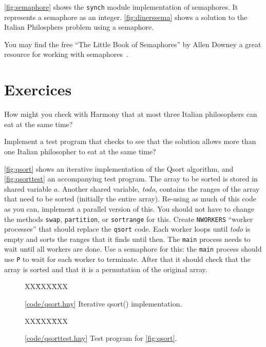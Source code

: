 \documentclass{report}
\newcommand{\harmonysource}[1]{
\begin{tabbing}
XX\=XXX\=XXX\kill
    
\end{tabbing}
}
\newcommand{\harmonylink}[1]{%
[\href{https://www.cs.cornell.edu/home/rvr/harmony/#1}{\underline{#1}}]%
}
\newenvironment{code}{
\tcolorbox
}{
\endtcolorbox
}
\begin{document}
\autoref{fig:semaphore} shows the \texttt{synch} module implementation of
semaphores.
It represents a semaphore as an integer.
\autoref{fig:dinerssema} shows a solution to the Italian Philosphers problem
using a semaphore.

You may find the free ``The Little Book of Semaphores'' by
Allen Downey a great resource for working with semaphores~\cite{Downey09}.

\section*{Exercices}
\begin{problems}
\item How might you check with Harmony that at most three
Italian philosophers can eat at the same time?
\item Implement a test program that checks to see that
the solution allows more than one Italian philosopher to eat at the same time?
\item \label{ex:qsort}
\autoref{fig:qsort} shows an iterative implementation of the Qsort
algorithm, and \autoref{fig:qsorttest} an accompanying test program.
The array to be sorted is stored in  shared variable $a$.
Another shared variable, \textit{todo}, contains the ranges of the
array that need to be sorted (initially the entire array).
Re-using as much of this code as you can, implement a parallel version of
this.  You should not have to change the methods \texttt{swap}, \texttt{partition},
or \texttt{sortrange} for this.  Create \texttt{NWORKERS} ``worker processes''
that should replace the \texttt{qsort} code.  Each worker loops until \textit{todo}
is empty and sorts the ranges that it finds until then.  The \texttt{main}
process needs to wait until all workers are done.  Use a semaphore for this:
the \texttt{main} process should use \texttt{P} to wait for each
worker to terminate.  After that it should check that the array is sorted and
that it is a permutation of the original array.
\end{problems}

\begin{figure}
\begin{code}
\harmonysource{qsort}
\end{code}
\caption{\harmonylink{code/qsort.hny} Iterative qsort() implementation.}
\label{fig:qsort}
\end{figure}

\begin{figure}
\begin{code}
\harmonysource{qsorttest}
\end{code}
\caption{\harmonylink{code/qsorttest.hny} Test program for \autoref{fig:qsort}.}
\label{fig:qsorttest}
\end{figure}
\end{document}
